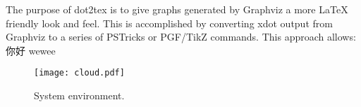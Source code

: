 \documentclass{article}
\begin{document}
\begin{CJK}{UTF8}{gbsn}
The purpose of dot2tex is to give graphs generated by Graphviz a more LaTeX friendly look and feel. This is accomplished by converting xdot output from Graphviz to a series of PSTricks or PGF/TikZ commands. This approach allows:你好 wewee

\begin{figure}[h]
    \centering
    \texttt{[image: cloud.pdf]}
    \caption{System environment.}
\end{figure}
\end{CJK}
\end{document}
